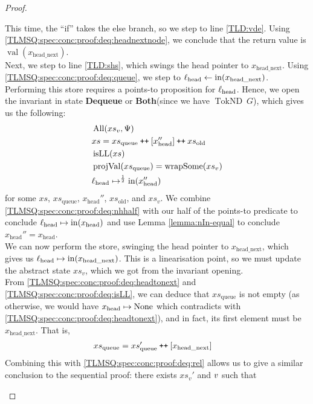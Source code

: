 \documentclass[a4paper, 10pt]{report}
\theoremstyle{definition}
\newcommand{\xsc}{xs}
\newcommand{\xsqueue}{xs_{\mathrm{queue}}}
\newcommand{\xsold}{xs_{\mathrm{old}}}
\newcommand{\isLL}{\operatorname{isLL}}
\newcommand{\AllP}{\operatorname{All}}
\newcommand{\projval}{\operatorname{projVal}}
\newcommand{\wrapsome}{\operatorname{wrapSome}}
\newcommand{\locN}[1]{\loc_{\mathrm{#1}}}
\newcommand{\lochead}{\locN{head}}
\newcommand{\nIn}[1]{\operatorname{in}(#1)}
\newcommand{\nVal}[1]{\operatorname{val}(#1)}
\newcommand{\node}{x}
\newcommand{\nodeN}[1]{\node_{\mathrm{#1}}}
\newcommand{\nodehead}{\nodeN{head}}
\newcommand{\nodeheadnext}{\nodeN{head\_next}}
\newcommand{\absvalue}{\val}
\newcommand{\absvalueList}{xs_v}
\newcommand{\DequeueState}{\textbf{Dequeue}\xspace}
\newcommand{\BothState}{\textbf{Both}\xspace}
\newcommand{\Qg}{G}
\newcommand{\TokND}[1]{\operatorname{TokND} ~ #1}
\newcommand{\TokNDQg}{\TokND{\Qg}}
\newcommand\catenate{\mathbin{\text{\ttfamily\upshape ++}}}
\begin{document}
\begin{proof}
\begin{itemize}
  This time, the ``if'' takes the else branch, so we step to line \ref{TLD:vde}. Using \ref{TLMSQ:spec:conc:proof:deq:headnextnode}, we conclude that the return value is $\nVal{\nodeheadnext}$.\\
  Next, we step to line \ref{TLD:shs}, which swings the head pointer to $\nodeheadnext$. Using \ref{TLMSQ:spec:conc:proof:deq:queue}, we step to $\lochead \gets \nIn{\nodeheadnext}$. Performing this store requires a points-to proposition for $\lochead$. Hence, we open the invariant in state \DequeueState or \BothState (since we have $\TokNDQg$), which gives us the following:
  \begin{align}
    &\AllP(\absvalueList, \Psi)\label{TLMSQ:spec:conc:proof:deq:allP}\\
    &\xsc = \xsqueue \catenate [\nodehead''] \catenate \xsold\label{TLMSQ:spec:conc:proof:deq:xsrel}\\
    &\isLL(\xsc)\label{TLMSQ:spec:conc:proof:deq:isLL}\\
    &\projval(\xsqueue) = \wrapsome(\absvalueList)\label{TLMSQ:spec:conc:proof:deq:rel}\\
    &\lochead \mapsto^{\frac{1}{2}} \nIn{\nodehead''}\label{TLMSQ:spec:conc:proof:deq:nhhalf}
  \end{align}
  for some $\xsc$, $\xsqueue$, $\nodehead''$,  $\xsold$, and $\absvalueList$. We combine \ref{TLMSQ:spec:conc:proof:deq:nhhalf} with our half of the points-to predicate to conclude $\lochead \mapsto \nIn{\nodehead}$ and use Lemma \ref{lemma:nIn-equal} to conclude $\nodehead'' = \nodehead$.\\
  We can now perform the store, swinging the head pointer to $\nodeheadnext$, which gives us $\lochead \mapsto \nIn{\nodeheadnext}$. This is a linearisation point, so we must update the abstract state $\absvalueList$, which we got from the invariant opening.\\
  From \ref{TLMSQ:spec:conc:proof:deq:headtonext} and \ref{TLMSQ:spec:conc:proof:deq:isLL}, we can deduce that $\xsqueue$ is not empty (as otherwise, we would have $\nodehead \mapsto \None$ which contradicts with \ref{TLMSQ:spec:conc:proof:deq:headtonext}), and in fact, its first element must be $\nodeheadnext$. That is,
  \begin{align}
    &\xsqueue = \xsqueue' \catenate [\nodeheadnext]\label{TLMSQ:spec:conc:proof:deq:xsqueue}
  \end{align}
  Combining this with \ref{TLMSQ:spec:conc:proof:deq:rel} allows us to give a similar conclusion to the sequential proof: there exists $\absvalueList'$ and $\absvalue$ such that

\end{itemize}
\end{proof}
\end{document}
